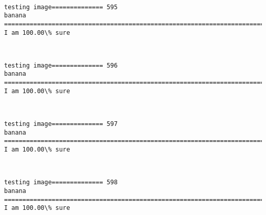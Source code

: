 \documentclass[11pt]{article}
\begin{document}
    \begin{center}
    \end{center}
    { \hspace*{\fill} \\}
    
    \begin{Verbatim}[commandchars=\\\{\}]
testing image============== 595
banana
============================================================================
I am 100.00\% sure

    \end{Verbatim}

    \begin{center}
    \end{center}
    { \hspace*{\fill} \\}
    
    \begin{Verbatim}[commandchars=\\\{\}]
testing image============== 596
banana
============================================================================
I am 100.00\% sure

    \end{Verbatim}

    \begin{center}
    \end{center}
    { \hspace*{\fill} \\}
    
    \begin{Verbatim}[commandchars=\\\{\}]
testing image============== 597
banana
============================================================================
I am 100.00\% sure

    \end{Verbatim}

    \begin{center}
    \end{center}
    { \hspace*{\fill} \\}
    
    \begin{Verbatim}[commandchars=\\\{\}]
testing image============== 598
banana
============================================================================
I am 100.00\% sure

    \end{Verbatim}
\end{document}
